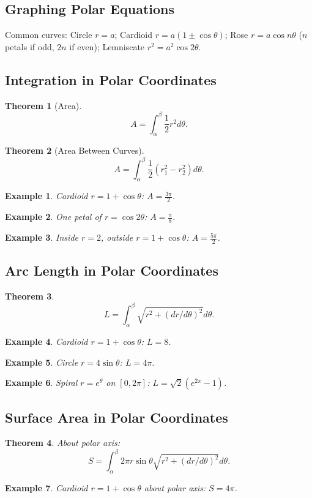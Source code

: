 \documentclass[11pt,a4paper]{article}
\newtheorem{example}{Example}
\newtheorem{theorem}{Theorem}
\begin{document}
\subsection{Graphing Polar Equations}
Common curves: Circle $r = a$; Cardioid $r = a(1\pm\cos\theta)$; Rose $r = a\cos n\theta$ ($n$ petals if odd, $2n$ if even); Lemniscate $r^2 = a^2\cos 2\theta$.
\subsection{Integration in Polar Coordinates}
\begin{theorem}[Area]
\[
A = \int_{\alpha}^{\beta} \frac{1}{2} r^2 d\theta.
\]
\end{theorem}
\begin{theorem}[Area Between Curves]
\[
A = \int_{\alpha}^{\beta} \frac{1}{2}(r_1^2 - r_2^2) d\theta.
\]
\end{theorem}
\begin{example}
Cardioid $r = 1+\cos\theta$: $A = \frac{3\pi}{2}$.
\end{example}
\begin{example}
One petal of $r = \cos 2\theta$: $A = \frac{\pi}{8}$.
\end{example}
\begin{example}
Inside $r=2$, outside $r=1+\cos\theta$: $A = \frac{5\pi}{2}$.
\end{example}
\subsection{Arc Length in Polar Coordinates}
\begin{theorem}
\[
L = \int_{\alpha}^{\beta} \sqrt{r^2 + (dr/d\theta)^2} d\theta.
\]
\end{theorem}
\begin{example}
Cardioid $r = 1+\cos\theta$: $L = 8$.
\end{example}
\begin{example}
Circle $r = 4\sin\theta$: $L = 4\pi$.
\end{example}
\begin{example}
Spiral $r = e^{\theta}$ on $[0,2\pi]$: $L = \sqrt{2}(e^{2\pi}-1)$.
\end{example}
\subsection{Surface Area in Polar Coordinates}
\begin{theorem}
About polar axis:
\[
S = \int_{\alpha}^{\beta} 2\pi r\sin\theta \sqrt{r^2 + (dr/d\theta)^2} d\theta.
\]
\end{theorem}
\begin{example}
Cardioid $r = 1+\cos\theta$ about polar axis: $S = 4\pi$.
\end{example}
\end{document}
